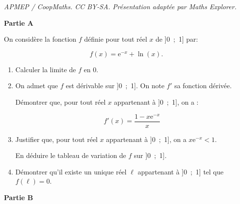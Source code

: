 \documentclass[10pt]{article}
\begin{document}
\noindent\textit{APMEP / CoopMaths. CC BY-SA. Présentation adaptée par Maths Explorer.}\par\medskip
\medskip

\textbf{Partie A}

\medskip

On considère la fonction $f$ définie pour tout réel $x$ de ]0~;~1] par:

\[f(x) = \text{e}^{-x} + \ln (x).\]

\smallskip

\begin{enumerate}
\item Calculer la limite de $f$ en $0$.
\item On admet que $f$ est dérivable sur ]0~;~1]. On note $f'$ sa fonction dérivée.

Démontrer que, pour tout réel $x$ appartenant à ]0~;~1], on a :

\[f'(x) = \dfrac{1 - x\text{e}^{-x}}{x}\]

\item Justifier que, pour tout réel $x$ appartenant à ]0~;~1], on a $x\text{e}^{-x} < 1$.

En déduire le tableau de variation de $f$ sur ]0~;~1].
\item Démontrer qu'il existe un unique réel $\ell$ appartenant à ]0~;~1] tel que $f(\ell) = 0$.
\end{enumerate}

\medskip

\textbf{Partie B}

\medskip
\end{document}
